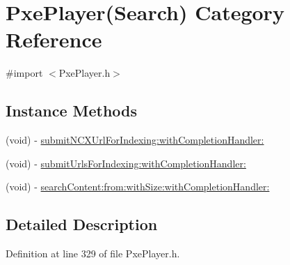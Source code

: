 \hypertarget{category_pxe_player_07_search_08}{\section{Pxe\-Player(Search) Category Reference}
\label{category_pxe_player_07_search_08}
}


{\ttfamily \#import $<$Pxe\-Player.\-h$>$}

\subsection*{Instance Methods}
\begin{DoxyCompactItemize}
\item 
(void) -\/ \hyperlink{category_pxe_player_07_search_08_acaf2f1bc4d262bd134d2adac85466d4e}{submit\-N\-C\-X\-Url\-For\-Indexing\-:with\-Completion\-Handler\-:}
\item 
(void) -\/ \hyperlink{category_pxe_player_07_search_08_abb97b28097be6751b5941b3149c4e3b6}{submit\-Urls\-For\-Indexing\-:with\-Completion\-Handler\-:}
\item 
(void) -\/ \hyperlink{category_pxe_player_07_search_08_ae5bdbf7faea3fb4c58be4d995c96f648}{search\-Content\-:from\-:with\-Size\-:with\-Completion\-Handler\-:}
\end{DoxyCompactItemize}


\subsection{Detailed Description}


Definition at line 329 of file Pxe\-Player.\-h.



